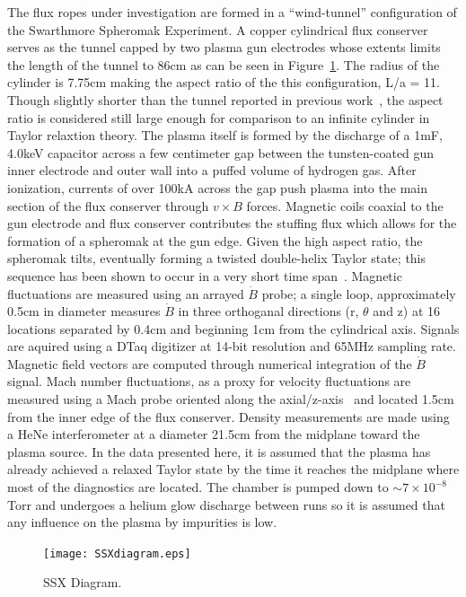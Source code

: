 \documentclass[12pt]{iopart}
\begin{document}
The flux ropes under investigation are formed in a "`wind-tunnel"' configuration of the Swarthmore Spheromak Experiment. A copper cylindrical flux conserver serves as the tunnel capped by two plasma gun electrodes whose extents limits the length of the tunnel to 86cm as can be seen in Figure~\ref{fig:SSXdiagram}. The radius of the cylinder is 7.75cm making the aspect ratio of the this configuration, L/a = 11. Though slightly shorter than the tunnel reported in previous work~\cite{Gray13}, the aspect ratio is considered still large enough for comparison to an infinite cylinder in Taylor relaxtion theory. The plasma itself is formed by the discharge of a 1mF, 4.0keV capacitor across a few centimeter gap between the tunsten-coated gun inner electrode and outer wall into a puffed volume of hydrogen gas. After ionization, currents of over 100kA across the gap push plasma into the main section of the flux conserver through $v \times B$ forces. Magnetic coils coaxial to the gun electrode and flux conserver contributes the stuffing flux which allows for the formation of a spheromak at the gun edge. Given the high aspect ratio, the spheromak tilts, eventually forming a twisted double-helix Taylor state; this sequence has been shown to occur in a very short time span~\cite{Gray13}. Magnetic fluctuations are measured using an arrayed $\dot{B}$ probe; a single loop, approximately 0.5cm in diameter measures $\dot{B}$ in three orthoganal directions (r, $\theta$ and z) at 16 locations separated by 0.4cm and beginning 1cm from the cylindrical axis. Signals are aquired using a DTaq digitizer at 14-bit resolution and 65MHz sampling rate. Magnetic field vectors are computed through numerical integration of the $\dot{B}$ signal. Mach number fluctuations, as a proxy for velocity fluctuations are measured using a Mach probe oriented along the axial/z-axis~\cite{Zhang11} and located 1.5cm from the inner edge of the flux conserver. Density measurements are made using a HeNe interferometer at a diameter 21.5cm from the midplane toward the plasma source. In the data presented here, it is assumed that the plasma has already achieved a relaxed Taylor state by the time it reaches the midplane where most of the diagnostics are located. The chamber is pumped down to $\sim 7 \times 10^{-8}$ Torr and undergoes a helium glow discharge between runs so it is assumed that any influence on the plasma by impurities is low.

\begin{figure}[!htbp]
\centerline{
\texttt{[image: SSXdiagram.eps]}}
\caption{\label{fig:SSXdiagram} SSX Diagram.}
\end{figure}
\end{document}
